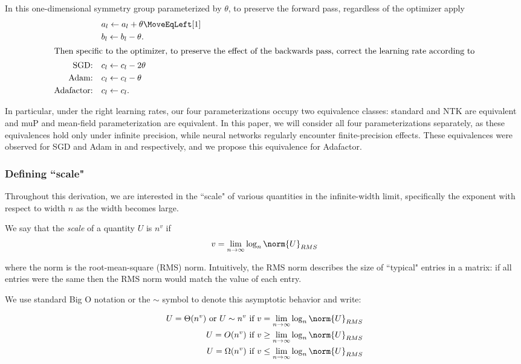 In this one-dimensional symmetry group parameterized by $\theta$, to preserve the forward pass, regardless of the optimizer apply
\begin{align*}
    &a_l \leftarrow a_l + \theta\MoveEqLeft[1]\\
    &b_l \leftarrow b_l - \theta.\\
\intertext{Then specific to the optimizer, to preserve the effect of the backwards pass, correct the learning rate according to}
    \textrm{SGD:}\quad&c_l \leftarrow c_l - 2\theta\\
    \textrm{Adam:}\quad&c_l \leftarrow c_l - \theta\\
    \textrm{Adafactor:}\quad&c_l \leftarrow c_l.
\end{align*}

In particular, under the right learning rates, our four parameterizations occupy two equivalence classes: standard and NTK are equivalent and muP and mean-field parameterization are equivalent. In this paper, we will consider all four parameterizations separately, as these equivalences hold only under infinite precision, while neural networks regularly encounter finite-precision effects. These equivalences were observed for SGD and Adam in \citet{yang2021tensoriv} and \citet{yang2023tensorivb} respectively, and we propose this equivalence for Adafactor.

\subsubsection{Defining ``scale"}
\label{app:theory_scale}
Throughout this derivation, we are interested in the ``scale" of various quantities in the infinite-width limit, specifically the exponent with respect to width $n$ as the width becomes large.

\begin{appendixdef}
We say that the \emph{scale} of a quantity $U$ is $n^v$ if 
\begin{align*}
v = \lim_{n \rightarrow \infty} \log_n \norm{U}_{RMS}
\end{align*}
\end{appendixdef}
where the norm is the root-mean-square (RMS) norm. Intuitively, the RMS norm describes the size of ``typical" entries in a matrix: if all entries were the same then the RMS norm would match the value of each entry.

We use standard Big O notation or the $\sim$ symbol to denote this asymptotic behavior and write:

\begin{align*}
U = \Theta(n^v) \textrm{ or } U \sim n^v \textrm{ if } v =  \lim_{n \rightarrow \infty} \log_n \norm{U}_{RMS}\\
U = O(n^v) \textrm{ if } v \geq  \lim_{n \rightarrow \infty} \log_n \norm{U}_{RMS}\\
U = \Omega(n^v) \textrm{ if } v \leq  \lim_{n \rightarrow \infty} \log_n \norm{U}_{RMS}
\end{align*}

